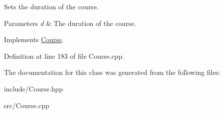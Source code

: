 Sets the duration of the course. 
\begin{DoxyParams}{Parameters}
{\em d} & The duration of the course. \\
\hline
\end{DoxyParams}


Implements \hyperlink{classCourse}{Course}.



Definition at line 183 of file Course.\+cpp.



The documentation for this class was generated from the following files\+:\begin{DoxyCompactItemize}
\item 
include/Course.\+hpp\item 
src/Course.\+cpp\end{DoxyCompactItemize}
